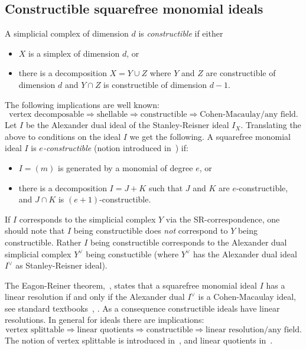 \subsection{Constructible squarefree monomial ideals}
\label{subsec:pre-const}
A simplicial complex of dimension $d$ is {\it constructible} if either
\begin{itemize}
\item $X$ is a simplex of dimension $d$, or
\item there is a decomposition $X = Y \cup Z$ where $Y$ and $Z$
  are constructible of dimension $d$ and $Y \cap Z$ is constructible
  of dimension $d-1$.
\end{itemize}
The following implications are well known:
\[ \text{vertex decomposable} \Rightarrow
  \text{shellable} \Rightarrow \text{constructible} \Rightarrow
  \text{Cohen-Macaulay/any field}. \]
Let $I$ be the Alexander dual ideal of the Stanley-Reisner ideal $I_X$.
Translating the above to conditions on the ideal $I$ we get the following.
A squarefree monomial ideal $I$ is {\it $e$-constructible}
(notion introduced in~\cite{Olt-Const}) if:
\begin{itemize}
\item $I = (m)$ is generated by a monomial of degree $e$, or
\item there is a decomposition $I = J + K$ such that $J$ and $K$
  are $e$-constructible, and $J \cap K$ is $(e+1)$-constructible.
\end{itemize}

\begin{rema} If $I$ corresponds to the simplicial complex $Y$ via
  the SR-correspondence, one should note that $I$ being constructible
  does {\it not} correspond to $Y$ being constructible. Rather $I$ being
  constructible corresponds to 
  the Alexander dual simplicial complex $Y^\vee$ being constuctible
  (where  $Y^\vee$ has the Alexander dual ideal $I^\vee$ as
  Stanley-Reisner ideal).
\end{rema}

The Eagon-Reiner theorem,~\cite{ER98}, states that a squarefree
monomial ideal $I$ has a linear resolution if and only if the Alexander dual $I^\vee$
is a Cohen-Macaulay ideal, see standard textbooks~\cite[Thm.~8.1.9]{HeHi},
\cite[Thm.~5.56]{MiSt}.
As a consequence constructible ideals have linear resolutions.
In general for ideals there are implications:
\[  \text{vertex splittable} \Rightarrow
  \text{linear quotients} \Rightarrow \text{constructible} \Rightarrow
  \text{linear resolution/any field}. \]
The notion of vertex splittable is introduced in~\cite{MoKa}, and
linear quotients in~\cite{HT-cones}.

